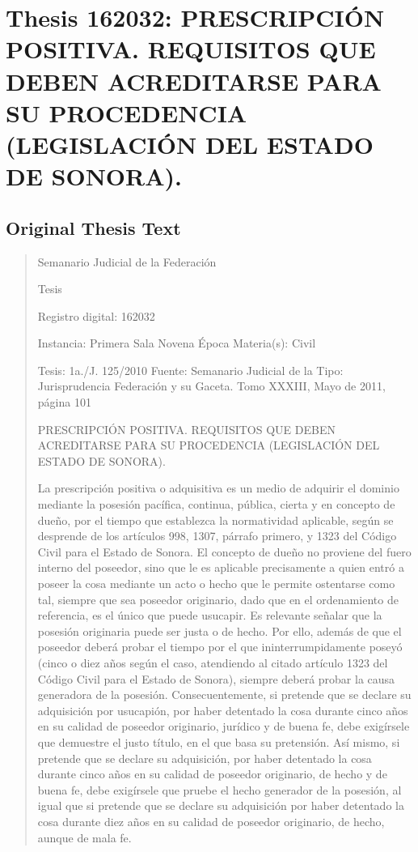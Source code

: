 \documentclass[11pt,a4paper]{article}
\begin{document}
\newpage

\section{Thesis 162032: PRESCRIPCIÓN POSITIVA. REQUISITOS QUE DEBEN ACREDITARSE PARA SU PROCEDENCIA (LEGISLACIÓN DEL ESTADO DE SONORA).}
\label{thesis:162032}

\subsection{Original Thesis Text}

\begin{quote}
                                                   Semanario Judicial de la Federación

                                                  Tesis

 Registro digital: 162032

 Instancia: Primera Sala          Novena Época                         Materia(s): Civil

 Tesis: 1a./J. 125/2010           Fuente: Semanario Judicial de la  Tipo: Jurisprudencia
                                  Federación y su Gaceta.
                                  Tomo XXXIII, Mayo de 2011, página
                                  101


PRESCRIPCIÓN POSITIVA. REQUISITOS QUE DEBEN ACREDITARSE PARA SU
PROCEDENCIA (LEGISLACIÓN DEL ESTADO DE SONORA).


La prescripción positiva o adquisitiva es un medio de adquirir el dominio mediante la posesión
pacífica, continua, pública, cierta y en concepto de dueño, por el tiempo que establezca la
normatividad aplicable, según se desprende de los artículos 998, 1307, párrafo primero, y 1323 del
Código Civil para el Estado de Sonora. El concepto de dueño no proviene del fuero interno del
poseedor, sino que le es aplicable precisamente a quien entró a poseer la cosa mediante un acto o
hecho que le permite ostentarse como tal, siempre que sea poseedor originario, dado que en el
ordenamiento de referencia, es el único que puede usucapir. Es relevante señalar que la posesión
originaria puede ser justa o de hecho. Por ello, además de que el poseedor deberá probar el tiempo
por el que ininterrumpidamente poseyó (cinco o diez años según el caso, atendiendo al citado
artículo 1323 del Código Civil para el Estado de Sonora), siempre deberá probar la causa
generadora de la posesión. Consecuentemente, si pretende que se declare su adquisición por
usucapión, por haber detentado la cosa durante cinco años en su calidad de poseedor originario,
jurídico y de buena fe, debe exigírsele que demuestre el justo título, en el que basa su pretensión.
Así mismo, si pretende que se declare su adquisición, por haber detentado la cosa durante cinco
años en su calidad de poseedor originario, de hecho y de buena fe, debe exigírsele que pruebe el
hecho generador de la posesión, al igual que si pretende que se declare su adquisición por haber
detentado la cosa durante diez años en su calidad de poseedor originario, de hecho, aunque de
mala fe.



\end{quote}
\end{document}
